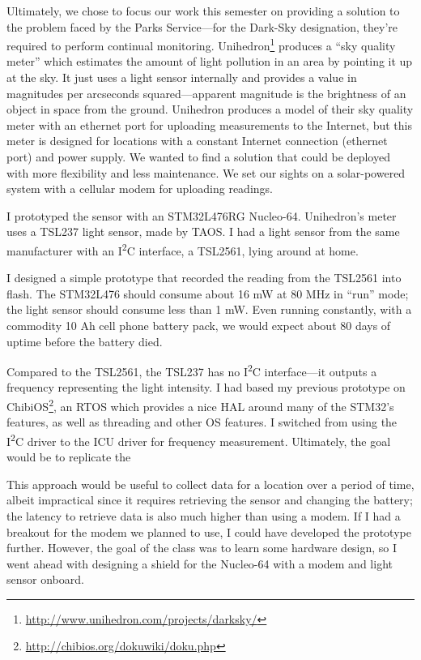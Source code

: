 \documentclass{article}
\begin{document}
Ultimately, we chose to focus our work this semester on providing a solution to the problem faced by the Parks Service---for the Dark-Sky designation, they're required to perform continual monitoring. Unihedron\footnote{\url{http://www.unihedron.com/projects/darksky/}} produces a ``sky quality meter'' which estimates the amount of light pollution in an area by pointing it up at the sky. It just uses a light sensor internally and provides a value in magnitudes per arcseconds squared---apparent magnitude is the brightness of an object in space from the ground. Unihedron produces a model of their sky quality meter with an ethernet port for uploading measurements to the Internet, but this meter is designed for locations with a constant Internet connection (ethernet port) and power supply. We wanted to find a solution that could be deployed with more flexibility and less maintenance. We set our sights on a solar-powered system with a cellular modem for uploading readings.

I prototyped the sensor with an STM32L476RG Nucleo-64. Unihedron's meter uses a TSL237 light sensor, made by TAOS. I had a light sensor from the same manufacturer with an I\textsuperscript{2}C interface, a TSL2561, lying around at home.

I designed a simple prototype that recorded the reading from the TSL2561 into flash. The STM32L476 should consume about 16 mW at 80 MHz in ``run'' mode; the light sensor should consume less than 1 mW. Even running constantly, with a commodity 10 Ah cell phone battery pack, we would expect about 80 days of uptime before the battery died.

Compared to the TSL2561, the TSL237 has no I\textsuperscript{2}C interface---it outputs a frequency representing the light intensity. I had based my previous prototype on ChibiOS\footnote{\url{http://chibios.org/dokuwiki/doku.php}}, an RTOS which provides a nice HAL around many of the STM32's features, as well as threading and other OS features. I switched from using the I\textsuperscript{2}C driver to the ICU driver for frequency measurement. Ultimately, the goal would be to replicate the 

This approach would be useful to collect data for a location over a period of time, albeit impractical since it requires retrieving the sensor and changing the battery; the latency to retrieve data is also much higher than using a modem. If I had a breakout for the modem we planned to use, I could have developed the prototype further. However, the goal of the class was to learn some hardware design, so I went ahead with designing a shield for the Nucleo-64 with a modem and light sensor onboard.
\end{document}
